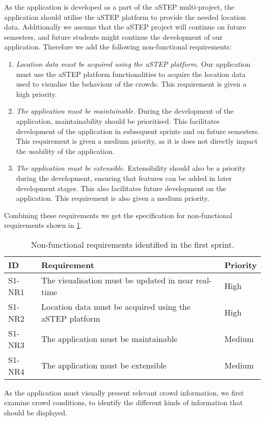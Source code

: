 As the application is developed as a part of the aSTEP multi-project, the application should utilise the aSTEP platform to provide the needed location data. Additionally we assume that the aSTEP project will continue on future semesters, and future students might continue the development of our application. Therefore we add the following non-functional requirements:

\begin{enumerate}[resume]
    \item \emph{Location data must be acquired using the aSTEP platform.} Our application must use the aSTEP platform functionalities to acquire the location data used to visualise the behaviour of the crowds. This requirement is given a high priority.
    \item \emph{The application must be maintainable.} During the development of the application, maintainability should be prioritised. This facilitates development of the application in subsequent sprints and on future semesters. This requirement is given a medium priority, as it is does not directly impact the usability of the application.
    \item \emph{The application must be extensible.} Extensibility should also be a priority during the development, ensuring that features can be added in later development stages. This also facilitates future development on the application. This requirement is also given a medium priority.
\end{enumerate}

Combining these requirements we get the specification for non-functional requirements shown in \cref{tab:s1_nreqs}.

\begin{table}[htbp]
	\centering
	\begin{tabularx}{\textwidth}{lXl}
		\toprule
		\textbf{ID} & \textbf{Requirement} & \textbf{Priority} \\
		\midrule 
		\rowcolor[HTML]{EFEFEF} 
		S1-NR1 & The visualisation must be updated in near real-time & High \\
		S1-NR2 & Location data must be acquired using the aSTEP platform & High \\
		\rowcolor[HTML]{EFEFEF} 
		S1-NR3 & The application must be maintainable & Medium \\
		S1-NR4 & The application must be extensible & Medium \\
		\bottomrule
	\end{tabularx}
	\caption{Non-functional requirements identified in the first sprint.}
	\label{tab:s1_nreqs}
\end{table}

As the application must visually present relevant crowd information, we first examine crowd conditions, to identify the different kinds of information that should be displayed.
